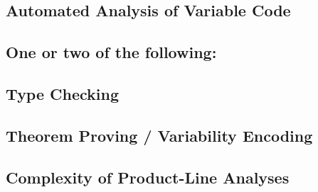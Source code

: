 
\subsection{Automated Analysis of Variable Code}

\subsection{One or two of the following:}

\subsection{Type Checking} %



\subsection{Theorem Proving / Variability Encoding}

\subsection{} %

\begin{frame}{}
\end{frame}

\subsection{Complexity of Product-Line Analyses} %

